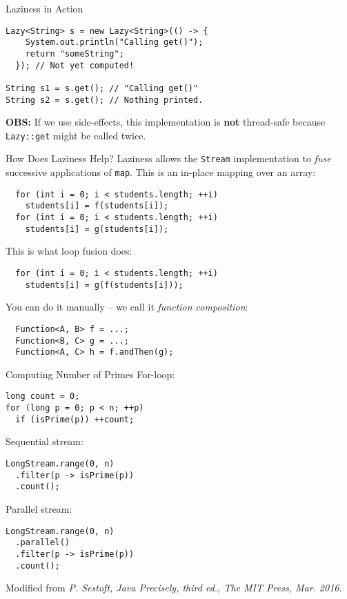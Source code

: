 \documentclass{beamer}
\begin{document}
\begin{frame}[fragile]{Laziness in Action}
\begin{lstlisting}
Lazy<String> s = new Lazy<String>(() -> {
    System.out.println("Calling get()");
    return "someString";
  }); // Not yet computed!

String s1 = s.get(); // "Calling get()"
String s2 = s.get(); // Nothing printed.
\end{lstlisting}

\pause{} \vspace{1cm} \textbf{OBS:} If we use side-effects, this implementation is \textbf{not} thread-safe because \lstinline{Lazy::get} might be called twice.

\end{frame}

\begin{frame}[fragile]{How Does Laziness Help?}
Laziness allows the \lstinline{Stream} implementation to \emph{fuse} successive applications of \lstinline{map}. This is an in-place mapping over an array:

\begin{lstlisting}
  for (int i = 0; i < students.length; ++i)
    students[i] = f(students[i]);
  for (int i = 0; i < students.length; ++i)
    students[i] = g(students[i]);
\end{lstlisting}

\pause{} This is what loop fusion does:
\begin{lstlisting}
  for (int i = 0; i < students.length; ++i)
    students[i] = g(f(students[i]));
\end{lstlisting}

\pause{} You can do it manually -- we call it \emph{function composition}:
\begin{lstlisting}
  Function<A, B> f = ...;
  Function<B, C> g = ...;
  Function<A, C> h = f.andThen(g);
\end{lstlisting}
\end{frame}

\begin{frame}[fragile]{Computing Number of Primes}
For-loop:
\begin{lstlisting}
long count = 0;
for (long p = 0; p < n; ++p)
  if (isPrime(p)) ++count;
\end{lstlisting}

\pause{} Sequential stream:
\begin{lstlisting}
LongStream.range(0, n)
  .filter(p -> isPrime(p))
  .count();
\end{lstlisting}

\pause{} Parallel stream:
\begin{lstlisting}
LongStream.range(0, n)
  .parallel()
  .filter(p -> isPrime(p))
  .count();
\end{lstlisting}

\footnotesize{Modified from \emph{P. Sestoft, Java Precisely, third ed., The MIT Press, Mar. 2016}.}
\end{frame}
\end{document}
